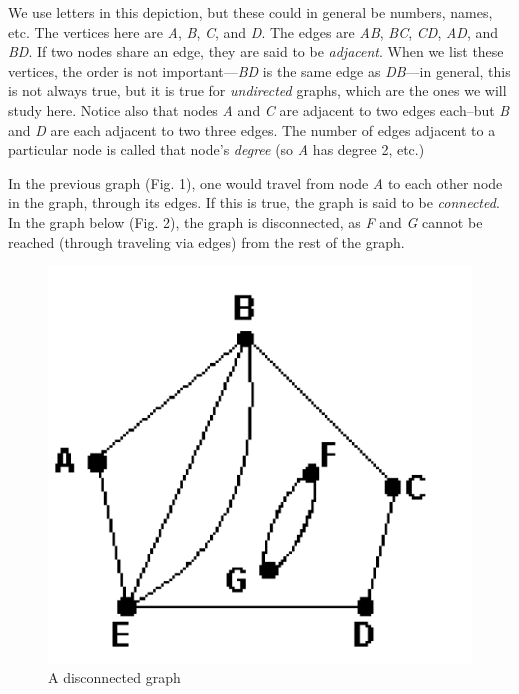 \documentclass[12pt]{article}
\begin{document}
We use letters in this depiction, but these could in general be numbers, names, etc. The vertices here are \emph{A}, \emph{B}, \emph{C}, and \emph{D}. The edges are \emph{AB}, \emph{BC}, \emph{CD}, \emph{AD}, and \emph{BD}. If two nodes share an edge, they are said to be \emph{adjacent}. When we list these vertices, the order is not important---\emph{BD} is the same edge as \emph{DB}---in general, this is not always true, but it is true for \emph{undirected} graphs, which are the ones we will study here. Notice also that nodes \emph{A} and \emph{C} are adjacent to two edges each--but \emph{B} and \emph{D} are each adjacent to two three edges. The number of edges adjacent to a particular node is called that node's \emph{degree} (so \emph{A} has degree 2, etc.)

In the previous graph (Fig. 1), one would travel from node \emph{A} to each other node in the graph, through its edges. If this is true, the graph is said to be \emph{connected}. In the graph below (Fig. 2), the graph is disconnected, as \emph{F} and \emph{G} cannot be reached (through traveling via edges) from the rest of the graph.

\begin{figure}[htbp]
\begin{center}
\includegraphics[]{disconnected.png}
\caption{A disconnected graph}
\label{default}
\end{center}
\end{figure}
\end{document}
